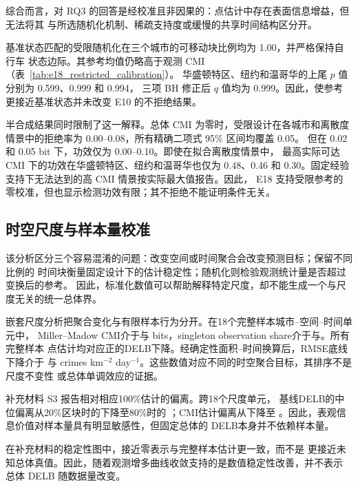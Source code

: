 综合而言，对 RQ3 的回答是经校准且非因果的：点估计中存在表面信息增益，但无法将其
与所选随机化机制、稀疏支持度或缓慢的共享时间结构区分开。



基准状态匹配的受限随机化在三个城市的可移动块比例均为 1.00，并严格保持自行车
状态边际。其参考均值仍略高于观测 CMI（表~\ref{tab:e18_restricted_calibration}）。
华盛顿特区、纽约和温哥华的上尾 \(p\) 值分别为 0.599、0.999 和 0.994，
三项 BH 修正后 \(q\) 值均为 0.999。因此，使参考更接近基准状态并未改变
E10 的不拒绝结果。

半合成结果同时限制了这一解释。总体 CMI 为零时，受限设计在各城市和离散度
情景中的拒绝率为 0.00--0.08，所有精确二项式 95\% 区间均覆盖 0.05。
但在 0.02 和 0.05 bit 下，功效仅为 0.00--0.10。即使在拟合离散度情景中，
最高实际可达 CMI 下的功效在华盛顿特区、纽约和温哥华也仅为 0.48、0.46
和 0.30。固定经验支持下无法达到的高 CMI 情景按实际最大值报告。因此，
E18 支持受限参考的零校准，但也显示检测功效有限；其不拒绝不能证明条件无关。

\subsection{时空尺度与样本量校准}
\label{subsec:e16_scale_results}

该分析区分三个容易混淆的问题：改变空间或时间聚合会改变预测目标；保留不同比例的
时间块衡量固定设计下的估计稳定性；随机化则检验观测统计量是否超过变换后的参考。
因此，标准化数值可以帮助解释特定尺度，却不能生成一个与尺度无关的统一总体界。

嵌套尺度分析把聚合变化与有限样本行为分开。在18个完整样本城市--空间--时间单元中，
Miller--Madow CMI介于\ScaleFullCMIMin{}与\ScaleFullCMIMax{} bits，singleton
observation share介于\ScaleSingletonMin{}与\ScaleSingletonMax{}。所有完整样本
点估计均对应正的DELB下降。经确定性面积--时间换算后，RMSE底线下降介于
\ScaleIntensityReductionMin{}与\ScaleIntensityReductionMax{} crimes
km\(^{-2}\) day\(^{-1}\)。这些数值对应不同的时空聚合目标，其排序不是尺度不变性
或总体单调效应的证据。

补充材料 S3 报告相对相应100\%估计的偏离。跨18个尺度单元，
基线DELB的中位偏离从20\%区块时的\ScaleBoundStabilityTwenty{}下降至80\%时的
\ScaleBoundStabilityEighty{}；CMI估计偏离从\ScaleCMIStabilityTwenty{}下降至
\ScaleCMIStabilityEighty{}。因此，表观信息价值对样本量具有明显敏感性，但固定总体的
DELB本身并不依赖样本量。

在补充材料的稳定性图中，接近零表示与完整样本估计更一致，而不是
更接近未知总体真值。因此，随着观测增多曲线收敛支持的是数值稳定性改善，并不表示
总体 DELB 随数据量改变。

